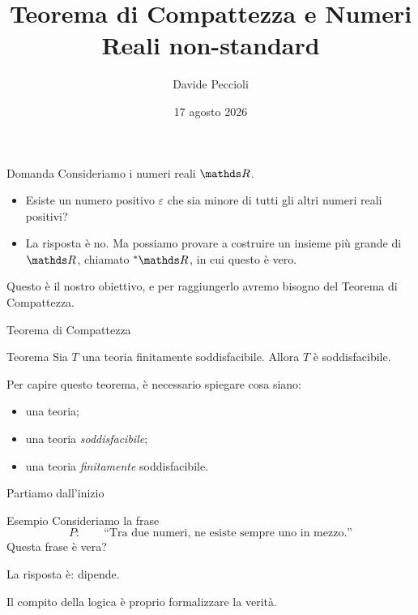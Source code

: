 \documentclass[babel]{beamer}
\institute[]{Università degli Studi di Torino}
\author{Davide Peccioli}
\date{17 agosto 2026}
\title{Teorema di Compattezza e Numeri Reali non-standard}
\begin{document}
\maketitle
\begin{frame}[label={sec:orgddb237d}]{Domanda}
Consideriamo i numeri reali \(\R\).

\begin{itemize}
\item Esiste un numero positivo \(\varepsilon\) che sia \alert{minore} di tutti gli altri numeri reali positivi?
\item La risposta è \alert{no}. Ma possiamo provare a costruire un insieme più grande di \(\R\), chiamato \(\null^{*}{\R}\), in cui questo è vero.
\end{itemize}

Questo è il nostro obiettivo, e per raggiungerlo avremo bisogno del \alert{Teorema di Compattezza}.
\end{frame}
\begin{frame}[label={sec:orgb21d814}]{Teorema di Compattezza}
\begin{block}{Teorema}
Sia \(T\) una teoria finitamente soddisfacibile. Allora \(T\) è soddisfacibile.
\end{block}
Per capire questo teorema, è necessario spiegare cosa siano:
\begin{itemize}
\item una teoria;
\item una teoria \emph{soddisfacibile};
\item una teoria \emph{finitamente} soddisfacibile.
\end{itemize}
\end{frame}
\begin{frame}[label={sec:org0085cfb}]{Partiamo dall'inizio}
\begin{block}{Esempio}
Consideriamo la frase
\begin{equation*}
P:\qquad \text{``Tra due numeri, ne esiste sempre uno in mezzo.''}
\end{equation*}
Questa frase \alert{è vera}?
\end{block}
La risposta è: \alert{dipende}.

Il compito della logica è proprio formalizzare la verità.
\end{frame}
\end{document}
